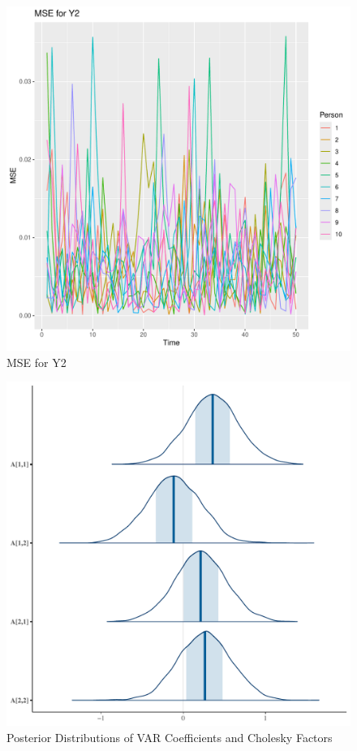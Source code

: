 \documentclass{article}
\begin{document}
\begin{figure}[h]
  \centering
  \includegraphics[width=\textwidth]{mse_plot_y2.pdf}
  \caption{MSE for Y2}
\end{figure}

\begin{figure}[h]
  \centering
  \includegraphics[width=\textwidth]{posterior_distributions_VAR.pdf}
  \caption{Posterior Distributions of VAR Coefficients and Cholesky Factors}
\end{figure}
\end{document}
